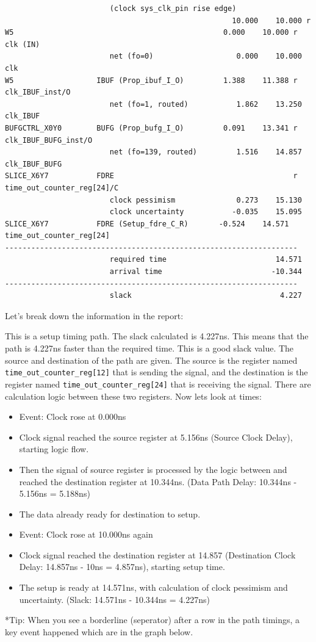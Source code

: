 \documentclass{report}
\newenvironment{narrowmargins}{
    \begin{adjustwidth}{-0.75in}{0.25in} %
}{
    \end{adjustwidth}
}
\begin{document}
\begin{narrowmargins}
\begin{verbatim}
                        (clock sys_clk_pin rise edge)
                                                    10.000    10.000 r  
W5                                                0.000    10.000 r  clk (IN)
                        net (fo=0)                   0.000    10.000    clk
W5                   IBUF (Prop_ibuf_I_O)         1.388    11.388 r  clk_IBUF_inst/O
                        net (fo=1, routed)           1.862    13.250    clk_IBUF
BUFGCTRL_X0Y0        BUFG (Prop_bufg_I_O)         0.091    13.341 r  clk_IBUF_BUFG_inst/O
                        net (fo=139, routed)         1.516    14.857    clk_IBUF_BUFG
SLICE_X6Y7           FDRE                                         r  time_out_counter_reg[24]/C
                        clock pessimism              0.273    15.130    
                        clock uncertainty           -0.035    15.095    
SLICE_X6Y7           FDRE (Setup_fdre_C_R)       -0.524    14.571    time_out_counter_reg[24]
-------------------------------------------------------------------
                        required time                         14.571    
                        arrival time                         -10.344    
-------------------------------------------------------------------
                        slack                                  4.227  
\end{verbatim}
\end{narrowmargins}
Let's break down the information in the report:

This is a setup timing path. The slack calculated is 4.227ns. This means that the path is 4.227ns faster than the required time. This is a good slack value.
The source and destination of the path are given. The source is the register named \texttt{time\_out\_counter\_reg[12]} that is sending the signal, and the destination is the register named \texttt{time\_out\_counter\_reg[24]} that is receiving the signal.
There are calculation logic between these two registers. Now lets look at times:
\begin{itemize}
    \item Event: Clock rose at 0.000ns
    \item Clock signal reached the source register at 5.156ns (Source Clock Delay), starting logic flow.
    \item Then the signal of source register is processed by the logic between and reached the destination register at 10.344ns. (Data Path Delay: 10.344ns - 5.156ns = 5.188ns)
    \item The data already ready for destination to setup.
    \item Event: Clock rose at 10.000ns again
    \item Clock signal reached the destination register at 14.857 (Destination Clock Delay: 14.857ns - 10ns = 4.857ns), starting setup time.
    \item The setup is ready at 14.571ns, with calculation of clock pessimism and uncertainty. (Slack: 14.571ns - 10.344ns = 4.227ns)
\end{itemize}
*Tip: When you see a borderline (seperator) after a row in the path timings, a key event happened which are in the graph below. 
\end{document}
